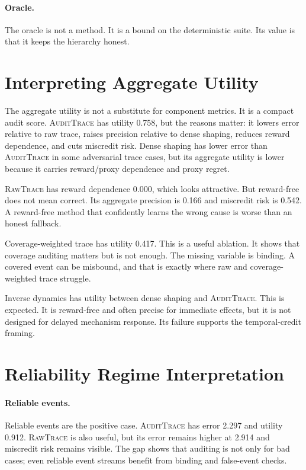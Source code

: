 \documentclass{article}
\newcommand{\method}{\textsc{AuditTrace}\xspace}
\newcommand{\rawtrace}{\textsc{RawTrace}\xspace}
\begin{document}
\paragraph{Oracle.}
The oracle is not a method. It is a bound on the deterministic suite. Its value is that it keeps the hierarchy honest.

\section{Interpreting Aggregate Utility}

The aggregate utility is not a substitute for component metrics. It is a compact audit score. \method has utility 0.758, but the reasons matter: it lowers error relative to raw trace, raises precision relative to dense shaping, reduces reward dependence, and cuts miscredit risk. Dense shaping has lower error than \method in some adversarial trace cases, but its aggregate utility is lower because it carries reward/proxy dependence and proxy regret.

\rawtrace has reward dependence 0.000, which looks attractive. But reward-free does not mean correct. Its aggregate precision is 0.166 and miscredit risk is 0.542. A reward-free method that confidently learns the wrong cause is worse than an honest fallback.

Coverage-weighted trace has utility 0.417. This is a useful ablation. It shows that coverage auditing matters but is not enough. The missing variable is binding. A covered event can be misbound, and that is exactly where raw and coverage-weighted trace struggle.

Inverse dynamics has utility between dense shaping and \method. This is expected. It is reward-free and often precise for immediate effects, but it is not designed for delayed mechanism response. Its failure supports the temporal-credit framing.

\section{Reliability Regime Interpretation}

\paragraph{Reliable events.}
Reliable events are the positive case. \method has error 2.297 and utility 0.912. \rawtrace is also useful, but its error remains higher at 2.914 and miscredit risk remains visible. The gap shows that auditing is not only for bad cases; even reliable event streams benefit from binding and false-event checks.
\end{document}
